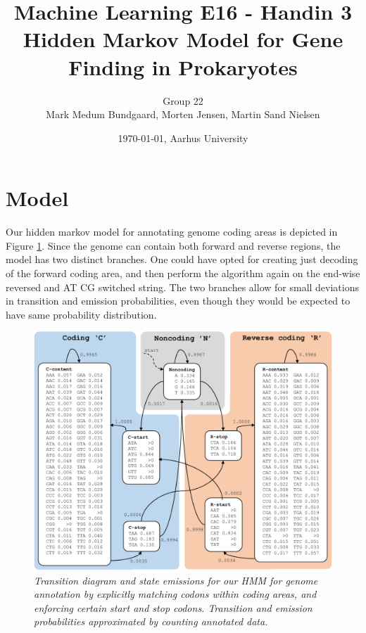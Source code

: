 \documentclass[a4paper,10pt,article,oneside,english]{memoir}
\let\oldcaption\caption
\renewcommand{\caption}[1]{\oldcaption{\emph{#1}}}
\begin{document}
	\title{Machine Learning E16 - Handin 3\\
		 Hidden Markov Model for Gene Finding in Prokaryotes}
	\author{Group 22\\
		Mark Medum Bundgaard, Morten Jensen, Martin Sand Nielsen}
	\date{\today, Aarhus University}
	
	\mainmatter
	\maketitle

\section*{Model}
Our hidden markov model for annotating genome coding areas is depicted in Figure \ref{fig:hmm_graph}. Since the genome can contain both forward and reverse regions, the model has two distinct branches. One could have opted for creating just decoding of the forward coding area, and then perform the algorithm again on the end-wise reversed and AT CG switched string. The two branches allow for small deviations in transition and emission probabilities, even though they would be expected to have same probability distribution.
\begin{figure}
	\centering
	\includegraphics[width=\linewidth]{HMM_graph_cropped.pdf}
	\caption{Transition diagram and state emissions for our HMM for genome annotation by explicitly matching codons within coding areas, and enforcing certain start and stop codons. Transition and emission probabilities approximated by counting annotated data.}
	\label{fig:hmm_graph}
\end{figure}
\end{document}
